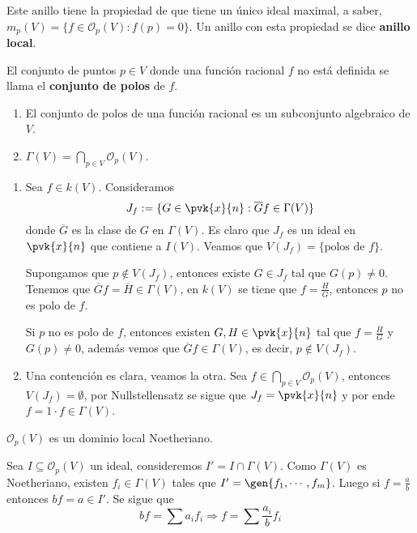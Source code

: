 \documentclass{article}
\begin{document}
\noindent Este anillo tiene la propiedad de que tiene un único ideal maximal, a saber, 
$m_{p}(V)=\{f\in\mathcal{O}_{p}(V):f(p)=0\}$. Un anillo con esta propiedad se dice 
\textbf{anillo local}.
\begin{dfn}
    El conjunto de puntos $p\in V$ donde una función racional $f$ no está definida se llama el
    \textbf{conjunto de polos} de $f$.
\end{dfn}
\begin{prop}\hspace{1mm}
    \begin{enumerate}
        \item El conjunto de polos de una función racional es un subconjunto algebraico de $V$.
        \item $\Gamma(V)=\bigcap_{p\in V}\mathcal{O}_{p}(V)$.
    \end{enumerate}
\end{prop}
\begin{dem}\hspace{1mm}
    \begin{enumerate}
        \item Sea $f\in k(V)$. Consideramos
        \begin{equation*}
            J_{f}:=\{G\in\pvk{x}{n}:\overline{G}f\in\Gamma(V)\}
        \end{equation*}
        donde $\overline{G}$ es la clase de $G$ en $\Gamma(V)$. Es claro que $J_{f}$ es un ideal
        en $\pvk{x}{n}$ que contiene a $I(V)$. Veamos que $V(J_{f})=\{\text{polos de }f\}$.

        \noindent Supongamos que $p\not\in V(J_{f})$, entonces existe $G\in J_{f}$ tal que 
        $G(p)\neq0$. Tenemos que $\overline{G}f=\overline{H}\in\Gamma(V)$, en $k(V)$ se tiene que
        $f=\frac{H}{G}$, entonces $p$ no es polo de $f$.
        
        \noindent Si $p$ no es polo de $f$, entonces existen $G,H\in\pvk{x}{n}$ tal que 
        $f=\frac{H}{G}$ y $G(p)\neq0$, además vemos que $\overline{G}f\in\Gamma(V)$, es decir, 
        $p\not\in V(J_{f})$.

        \item Una contención es clara, veamos la otra. Sea $f\in\bigcap_{p\in V}
        \mathcal{O}_{p}(V)$, entonces $V(J_{f})=\emptyset$, por Nullstellensatz se sigue que 
        $J_{f}=\pvk{x}{n}$ y por ende $f=1\cdot f\in\Gamma(V)$.
    \end{enumerate}
\end{dem}
\begin{prop}
    $\mathcal{O}_{p}(V)$ es un dominio local Noetheriano.
\end{prop}
\begin{dem}
    Sea $I\subseteq\mathcal{O}_{p}(V)$ un ideal, consideremos $I'=I\cap\Gamma(V)$. Como $\Gamma(V)$
    es Noetheriano, existen $f_{i}\in\Gamma(V)$ tales que $I'=\gen{f_{1},\cdots,f_{m}}$. Luego si
    $f=\frac{a}{b}$ entonces $bf=a\in I'$. Se sigue que
    \begin{equation*}
        bf=\sum a_{i}f_{i}\Rightarrow f=\sum\frac{a_{i}}{b}f_{i}
    \end{equation*}
\end{dem}

\end{document}

